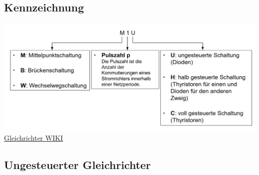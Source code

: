 \subsection{Kennzeichnung}
\includegraphics[width=0.8\linewidth]{images/SRKennzeichnung}\newline
\href{https://de.wikipedia.org/wiki/Gleichrichter}{Gleichrichter WIKI}

\clearpage
\subsection{Ungesteuerter Gleichrichter}
